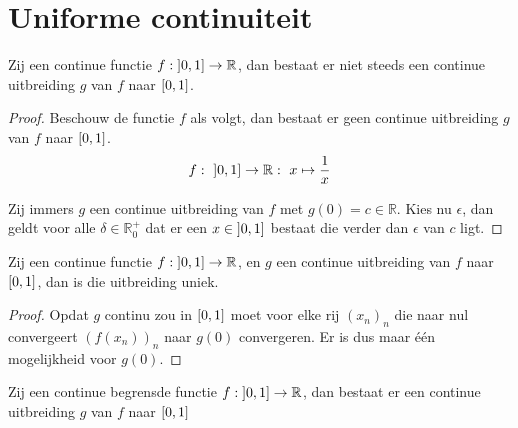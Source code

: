 \documentclass[main.tex]{subfiles}
\begin{document}
\section{Uniforme continuiteit}
\label{sec:unif-cont}

\begin{tvb}
  Zij een continue functie $f: \interval[open left]{0}{1} \rightarrow \mathbb{R}$, dan bestaat er niet steeds een continue uitbreiding $g$ van $f$ naar $\interval{0}{1}$.

  \begin{proof}
    Beschouw de functie $f$ als volgt, dan bestaat er geen continue uitbreiding $g$ van $f$ naar $\interval{0}{1}$.
    \[ f:\ \interval[open left]{0}{1} \rightarrow \mathbb{R}:\ x \mapsto \frac{1}{x} \]
    \begin{figure}[H]
      \centering
    \end{figure}
    Zij immers $g$ een continue uitbreiding van $f$ met $g(0)=c \in \mathbb{R}$.
    Kies nu $\epsilon$, dan geldt voor alle $\delta\in \mathbb{R}_{0}^{+}$ dat er een $x\in \interval[open left]{0}{1}$ bestaat die verder dan $\epsilon$ van $c$ ligt.
  \end{proof}
\end{tvb}

\begin{st}
  Zij een continue functie $f: \interval[open left]{0}{1} \rightarrow \mathbb{R}$, en $g$ een continue uitbreiding van $f$ naar $\interval{0}{1}$, dan is die uitbreiding uniek.
  
  \begin{proof}
    Opdat $g$ continu zou in $\interval{0}{1}$ moet voor elke rij $(x_{n})_{n}$ die naar nul convergeert $(f(x_{n}))_{n}$ naar $g(0)$ convergeren.\needed
    Er is dus maar \'e\'en mogelijkheid voor $g(0)$.
  \end{proof}
\end{st}

\begin{st}
  Zij een continue begrensde functie $f: \interval[open left]{0}{1} \rightarrow \mathbb{R}$, dan bestaat er een continue uitbreiding $g$ van $f$ naar $\interval{0}{1}$
\end{st}
\end{document}
